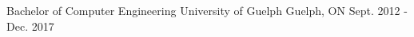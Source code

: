 

\begin{cventries}

  \cventry
    {Bachelor of Computer Engineering} %
    {University of Guelph} %
    {Guelph, ON} %
    {Sept. 2012 - Dec. 2017} %
    {}

\end{cventries}